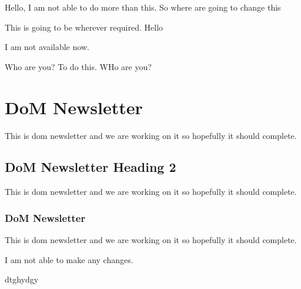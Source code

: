\documentclass{article}
\begin{document}
Hello, I am not able to do more than this. So where are going to change this



This is going to be wherever required. Hello



I am not available now.



Who are you? To do this. WHo are you?



\section{DoM Newsletter}
This is dom newsletter  and we are working on it so hopefully it should complete.



\subsection{DoM Newsletter Heading 2}
This is dom newsletter  and we are working on it so hopefully it should complete.



\subsubsection{DoM Newsletter}
This is dom newsletter  and we are working on it so hopefully it should complete.



I am not able to make any changes.

dtghydgy
\end{document}
